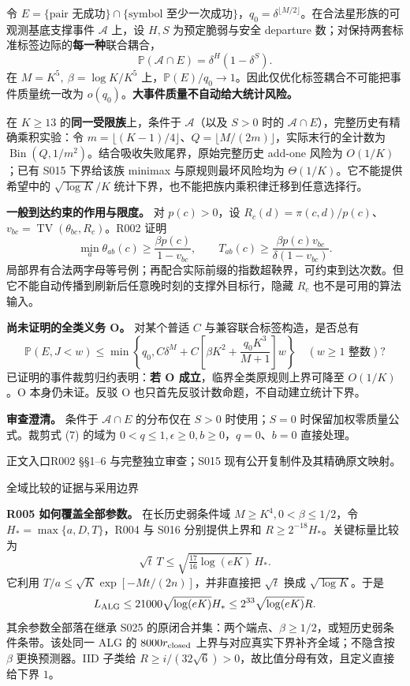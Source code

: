 \documentclass[11pt,a4paper]{article}
\newcommand{\TV}{\operatorname{TV}}\newcommand{\E}{\mathbb E}\newcommand{\Prob}{\mathbb P}
\newcommand{\head}[2]{{\small\sffamily #1}\par\vspace{2pt}{\LARGE\bfseries #2}\par\vspace{5pt}}
\newcommand{\entry}[1]{\vfill{\noindent\small\raggedright 正文入口\quad #1\par}}
\begin{document}
令 $E=\{\text{pair 无成功}\}\cap\{\text{symbol 至少一次成功}\}$，$q_0=\delta^{\lfloor M/2\rfloor}$。在合法星形族的可观测基底支撑事件 $\mathcal A$ 上，设 $H,S$ 为预定脆弱与安全 departure 数；对保持两套标准标签边际的\textbf{每一种}联合耦合，
\[
 \Prob(\mathcal A\cap E)=\delta^H(1-\delta^S).
\]
在 $M=K^5,\ \beta=\log K/K^5$ 上，$\Prob(E)/q_0\to1$。因此仅优化标签耦合不可能把事件质量统一改为 $o(q_0)$。\textbf{大事件质量不自动给大统计风险。}

在 $K\ge13$ 的\textbf{同一受限族}上，条件于 $\mathcal A$（以及 $S>0$ 时的 $\mathcal A\cap E$），完整历史有精确乘积实验：令 $m=\lfloor(K-1)/4\rfloor$、$Q=\lfloor M/(2m)\rfloor$，实际末行的全计数为
$\operatorname{Bin}(Q,1/m^2)$。结合吸收失败尾界，原始完整历史 add-one 风险为 $O(1/K)$；已有 S015 下界给该族 minimax 与原规则最坏风险均为 $\Theta(1/K)$。它不能提供希望中的 $\sqrt{\log K}/K$ 统计下界，也不能把族内乘积律迁移到任意选择行。

\textbf{一般到达约束的作用与限度。} 对 $p(c)>0$，设 $R_c(d)=\pi(c,d)/p(c)$、$v_{bc}=\TV(\theta_{bc},R_c)$。R002 证明
\[
 \min_a\theta_{ab}(c)\ge\frac{\beta p(c)}{1-v_{bc}},\qquad
 T_{ab}(c)\ge\frac{\beta p(c)v_{bc}}{\delta(1-v_{bc})}.
\]
局部界有合法两字母等号例；再配合实际前缀的指数超鞅界，可约束到达次数。但它不能自动传播到刷新后任意晚时刻的支撑外目标行，隐藏 $R_c$ 也不是可用的算法输入。

\textbf{尚未证明的全类义务 O。} 对某个普适 $C$ 与兼容联合标签构造，是否总有
\[
 \Prob(E,J<w)\le\min\!\left\{q_0,
 C\delta^M+C\left[\beta K^2+\frac{q_0K^3}{M+1}\right]w\right\}
 \quad(w\ge1\text{ 整数})?
\]
已证明的事件裁剪归约表明：\textbf{若 O 成立}，临界全类原规则上界可降至 $O(1/K)$。O 本身仍未证。反驳 O 也只首先反驳计数命题，不自动建立统计下界。

\textbf{审查澄清。} 条件于 $\mathcal A\cap E$ 的分布仅在 $S>0$ 时使用；$S=0$ 时保留加权零质量公式。裁剪式 (7) 的域为 $0<q\le1,\epsilon\ge0,b\ge0$，$q=0$、$b=0$ 直接处理。
\entry{R002 §§1--6 与完整独立审查；S015 现有公开复制件及其精确原文映射。}
\newpage
\head{全域比较的证据与采用边界}{上界已经全域而精确代价仍开放}
\textbf{R005 如何覆盖全部参数。} 在长历史弱条件域 $M\ge K^4,0<\beta\le1/2$，令 $H_*=\max\{a,D,T\}$，R004 与 S016 分别提供上界和
$R\ge2^{-18}H_*$。关键标量比较为
\[
 \sqrt t\,T\le\sqrt{\tfrac{17}{16}\log(eK)}\,H_*.
\]
它利用 $T/a\le\sqrt K\exp[-Mt/(2n)]$，并非直接把 $\sqrt t$ 换成 $\sqrt{\log K}$。于是
\[
 L_{\rm ALG}\le21000\sqrt{\log(eK)}H_*
 \le2^{33}\sqrt{\log(eK)}R.
\]
其余参数全部落在继承 S025 的原闭合并集：两个端点、$\beta\ge1/2$，或短历史弱条件条带。该处同一 ALG 的 $8000r_{\rm closed}$ 上界与对应真实下界补齐全域；不隐含按 $\beta$ 更换预测器。IID 子类给 $R\ge i/(32\sqrt6)>0$，故比值分母有效，且定义直接给下界 $1$。
\end{document}
